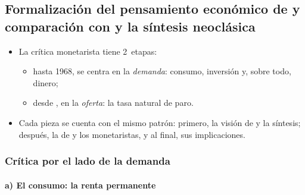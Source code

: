 \documentclass[11pt]{article}
\begin{document}
\subsection{Formalización del pensamiento económico de \cortetitulo{} y comparación con  y la síntesis neoclásica}\label{sec:formalizacion}

\begin{itemize}
\item La crítica monetarista tiene 2~etapas:
  \begin{itemize}
  \item hasta 1968, se centra en la \emph{demanda}: consumo, inversión y, sobre todo, dinero;
  \item desde \textcite{Friedman1968Role}, en la \emph{oferta}: la tasa natural de paro.
  \end{itemize}
\item Cada pieza se cuenta con el mismo patrón: primero, la visión de  y la síntesis; después, la de  y los monetaristas, y al final, sus implicaciones.
\end{itemize}

\subsubsection{Crítica por el lado de la demanda}\label{sec:demanda}

\paragraph{a) El consumo: la renta permanente}
\end{document}
